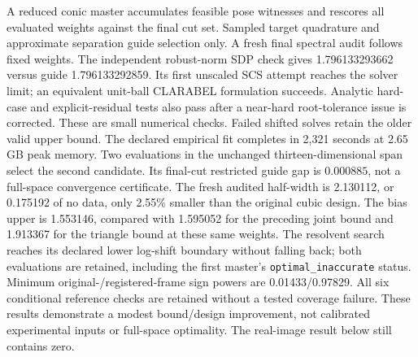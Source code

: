 A reduced conic master accumulates feasible pose witnesses and rescores all
evaluated weights against the final cut set. Sampled target quadrature and
approximate separation guide selection only. A fresh final
spectral audit follows fixed weights. The independent robust-norm SDP check
gives 1.796133293662 versus guide 1.796133292859. Its first unscaled SCS
attempt reaches the solver limit; an equivalent unit-ball CLARABEL formulation
succeeds. Analytic hard-case and explicit-residual tests also pass after a
near-hard root-tolerance issue is corrected. These are small numerical checks.
Failed shifted solves retain the older valid upper bound. The declared empirical
fit completes in 2,321 seconds at 2.65\,GB peak memory. Two evaluations in the
unchanged thirteen-dimensional span select the second candidate. Its final-cut
restricted guide gap is $0.000885$, not a full-space convergence certificate.
The fresh audited half-width is 2.130112, or 0.175192 of no data, only 2.55\%
smaller than the original cubic design. The bias upper is 1.553146, compared
with 1.595052 for the preceding joint bound and 1.913367 for the triangle bound
at these same weights. The resolvent search reaches its declared lower
log-shift boundary without falling back; both evaluations are retained,
including the first master's \texttt{optimal\_inaccurate} status.
Minimum original-/registered-frame sign powers are 0.01433/0.97829. All six
conditional reference checks are retained without a tested coverage failure.
These results demonstrate a modest bound/design improvement, not calibrated
experimental inputs or full-space optimality. The real-image result below
still contains zero.
